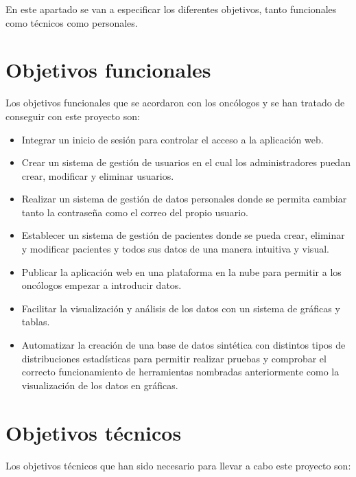 
En este apartado se van a especificar los diferentes objetivos, tanto funcionales como técnicos como personales.

\section{Objetivos funcionales}

Los objetivos funcionales que se acordaron con los oncólogos y se han tratado de conseguir con este proyecto son:

\begin{itemize}
    \item Integrar un inicio de sesión para controlar el acceso a la aplicación web.
	\item Crear un sistema de gestión de usuarios en el cual los administradores puedan crear, modificar y eliminar usuarios.
	\item Realizar un sistema de gestión de datos personales donde se permita cambiar tanto la contraseña como el correo del propio usuario.
	\item Establecer un sistema de gestión de pacientes donde se pueda crear, eliminar y modificar pacientes y todos sus datos de una manera intuitiva y visual.
	\item Publicar la aplicación web en una plataforma en la nube para permitir a los oncólogos empezar a introducir datos.
	\item Facilitar la visualización y análisis de los datos con un sistema de gráficas y tablas.
	\item Automatizar la creación de una base de datos sintética con distintos tipos de distribuciones estadísticas para permitir realizar pruebas y comprobar el correcto funcionamiento de herramientas nombradas anteriormente como la visualización de los datos en gráficas.
\end{itemize}
\section{Objetivos técnicos}
Los objetivos técnicos que han sido necesario para llevar a cabo este proyecto son:

